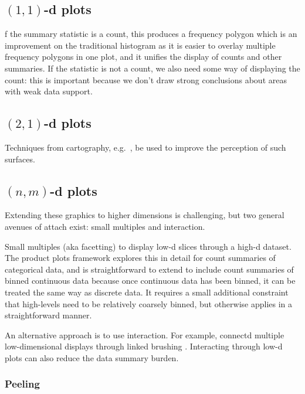 \documentclass[journal]{vgtc}                %
\begin{document}
\subsection{\texorpdfstring{$(1,1)$}{(1, 1)}-d plots}
\label{sub:1d-plots}

f the summary statistic is a count, this produces a frequency polygon \citep{scott:1985a} which is an improvement on the traditional histogram as it is easier to overlay multiple frequency polygons in one plot, and it unifies the display of counts and other summaries. If the statistic is not a count, we also need some way of displaying the count: this is important because we don't draw strong conclusions about areas with weak data support.

\subsection{\texorpdfstring{$(2,1)$}{(2, 1)}-d plots}
\label{sub:2d-plots}

Techniques from cartography, e.g.\ \citep{kennelly:2002}, be used to improve the perception of such surfaces.

\subsection{\texorpdfstring{$(n, m)$}{(n, m)}-d plots}
\label{sub:nd-plots}

Extending these graphics to higher dimensions is challenging, but two general avenues of attach exist: small multiples and interaction.

Small multiples (aka facetting) to display low-d slices through a high-d dataset. The product plots \citep{me:prodplots} framework explores this in detail for count summaries of categorical data, and is straightforward to extend to include count summaries of binned continuous data because once continuous data has been binned, it can be treated the same way as discrete data. It requires a small additional constraint that high-levels need to be relatively coarsely binned, but otherwise applies in a straightforward manner.

An alternative approach is to use interaction. For example, connectd multiple low-dimensional displays through linked brushing \citep{liu:2013,swayne:2003}.  Interacting through low-d plots can also reduce the data summary burden.

\subsubsection{Peeling}
\label{sub:peeling}
\end{document}
